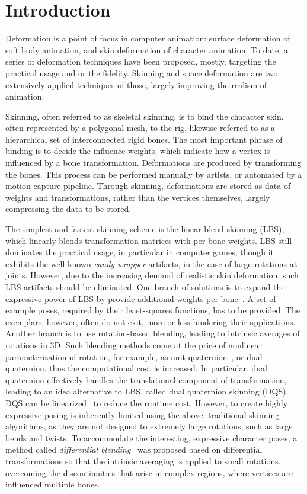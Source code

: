   \singlelinetitle\chapter{Introduction}
  \label{introduction}
Deformation is a point of focus in computer animation: surface deformation of soft body animation, and skin deformation of character animation. To date, a series of deformation techniques have been proposed, mostly,  targeting the practical usage and or the fidelity. Skinning and space deformation are two extensively applied techniques of those, largely improving the realism of animation. 

Skinning, often referred to as skeletal skinning, is to bind the character skin, often represented by a polygonal mesh, to the rig, likewise referred to as a hierarchical set of interconnected rigid bones. The most important phrase of binding is to decide the influence weights, which indicate how a vertex is influenced by a bone transformation. Deformations are produced by transforming the bones. This process can be performed manually by artists, or automated by a motion capture pipeline. Through skinning, deformations are stored as data of weights and transformations, rather than the vertices themselves, largely compressing the data to be stored.

The simplest and fastest skinning scheme is the linear blend skinning (LBS), which linearly blends transformation matrices with per-bone weights. LBS still dominates the practical usage, in particular in computer games, though it exhibits the well known \textit{candy-wrapper} artifacts, in the case of large rotations at joints. However, due to the increasing demand of realistic skin deformation, such LBS artifacts should be eliminated. One branch of solutions is to expand the expressive power of LBS by provide additional weights per bone~\cite{Wang:2002:MEL,Merry:2006:AST}. A set of example poses, required by their least-squares functions, has to be provided. The exemplars, however, often do not exit, more or less hindering their applications. Another branch is to use rotation-based blending, leading to intrinsic averages of rotations in 3D. Such blending methods come at the price of nonlinear parameterization of rotation, for example, as unit quaternion~\cite{Kavan:2005:SBS}, or dual quaternion\cite{Kavan:2008:GSA}, thus the computational cost is increased. In particular, dual quaternion effectively handles the translational component of transformation, leading to an idea alternative to LBS, called dual quaternion skinning (DQS). DQS can be linearized~\cite{Kavan:2009:ALN} to reduce the runtime cost. However, to create highly expressive posing is inherently limited using the above, traditional skinning algorithms, as they are not designed to extremely large rotations, such as large bends and twists. To accommodate the interesting, expressive character poses, a method called \textit{differential blending}~\cite{Oztireli:2013:DBE} was proposed based on differential transformations so that the intrinsic averaging is applied to small rotations, overcoming the discontinuities that arise in complex regions, where vertices are influenced multiple bones.

